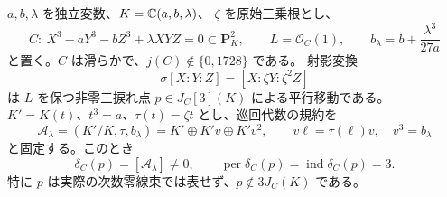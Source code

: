 \begin{proposition}
\label{prop:nfm-picard-cubic-index-sharp}
$a,b,\lambda$ を独立変数、$K=\mathbb C(a,b,\lambda)$、
$\zeta$ を原始三乗根とし、
\[
 C:\ X^3-aY^3-bZ^3+\lambda XYZ=0\subset\mathbf P^2_K,
 \qquad L=\mathcal O_C(1),\qquad
 b_\lambda=b+\frac{\lambda^3}{27a}
\]
と置く。$C$ は滑らかで、$j(C)\notin\{0,1728\}$ である。
射影変換
\[
 \sigma[X:Y:Z]=[X:\zeta Y:\zeta^2Z]
\]
は $L$ を保つ非零三捩れ点 $p\in J_C[3](K)$ による平行移動である。
$K'=K(t)$、$t^3=a$、$\tau(t)=\zeta t$ とし、巡回代数の規約を
\[
 \mathcal A_\lambda=(K'/K,\tau,b_\lambda)
   =K'\oplus K'v\oplus K'v^2,\qquad
 v\ell=\tau(\ell)v,\quad v^3=b_\lambda
\]
と固定する。このとき
\begin{equation}\label{eq:nfm-picard-diagonal-symbol}
 \delta_C(p)=[\mathcal A_\lambda]\ne0,\qquad
 \operatorname{per}\delta_C(p)
   =\operatorname{ind}\delta_C(p)=3.
\end{equation}
特に $p$ は実際の次数零線束では表せず、$p\notin3J_C(K)$ である。
\end{proposition}

